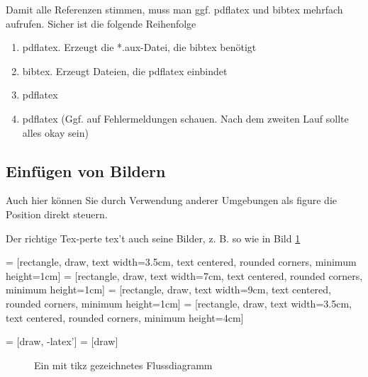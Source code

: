 \documentclass []{scrartcl}
\begin{document}
Damit alle Referenzen stimmen, muss man ggf. pdflatex und bibtex mehrfach aufrufen. Sicher ist die folgende Reihenfolge
\begin{enumerate}
\item pdflatex. Erzeugt die *.aux-Datei, die bibtex benötigt
\item bibtex. Erzeugt Dateien, die pdflatex einbindet
\item pdflatex
\item pdflatex (Ggf. auf Fehlermeldungen schauen. Nach dem zweiten Lauf sollte alles okay sein)
\end{enumerate}



\subsection{Einfügen von Bildern}


Auch hier können Sie durch Verwendung anderer Umgebungen als figure die Position direkt steuern.

Der richtige Tex-perte tex't auch seine Bilder, z. B. so wie in Bild \ref{bild2}

	 = [rectangle, draw, 
    text width=3.5cm, text centered, rounded corners, minimum height=1cm]
	 = [rectangle, draw, 
    text width=7cm, text centered, rounded corners, minimum height=1cm]
	 = [rectangle, draw, 
    text width=9cm, text centered, rounded corners, minimum height=1cm]
	 = [rectangle, draw, 
    text width=3.5cm, text centered, rounded corners, minimum height=4cm]
	 
	 = [draw, -latex']
	 = [draw]

\begin{figure}
\caption{Ein mit tikz gezeichnetes Flussdiagramm}
\label{bild2}
\end{figure}
\end{document}
